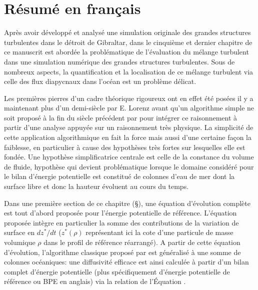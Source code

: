 \vspace{-1.\baselineskip}
\section{Résumé en français}
Après avoir développé et analysé une simulation originale des grandes structures turbulentes dans le détroit de Gibraltar, dans le cinquième et dernier chapitre de ce manuscrit est abordée la problématique de l'évaluation du mélange turbulent dans une simulation numérique des grandes structures turbulentes. Sous de nombreux aspects, la quantification et la localisation de ce mélange turbulent via celle des flux diapycnaux dans l'océan est un problème délicat.

Les premières pierres d'un cadre théorique rigoureux ont en effet été posées il y a maintenant plus d'un demi-siècle par E. Lorenz \citep{lorenz_available_1955} avant qu'un algorithme simple ne soit proposé à la fin du siècle précédent par \cite{winters_available_1995} pour intégrer ce raisonnement à partir d'une analyse appuyée sur un raisonnement très physique. La simplicité de cette application algorithmique en fait la force mais aussi d'une certaine façon la faiblesse, en particulier à cause des hypothèses très fortes sur lesquelles elle est fondée. Une hypothèse simplificatrice centrale est celle de la constance du volume de fluide, hypothèse qui devient problématique lorsque le domaine considéré pour le bilan d'énergie potentielle est constitué de colonnes d'eau de mer dont la surface libre et donc la hauteur évoluent au cours du temps.

Dans une première section de ce chapitre (\S {}), une équation d'évolution complète est tout d'abord proposée pour l'énergie potentielle de référence. L'équation proposée intègre en particulier la somme des contributions de la variation de surface en $dz^*/dt$ ($z^*(\rho)$ représentant ici la cote d'une particule de masse volumique $\rho$ dans le profil de référence réarrangé). A partir de cette équation d'évolution, l'algorithme classique proposé par \cite{winters_available_1995} est généralisé à une somme de colonnes océaniques: une diffusivité efficace est ainsi calculée à partir d'un bilan complet d'énergie potentielle (plus spécifiquement d'énergie potentielle de référence ou BPE en anglais) via la relation de l'\'Equation .

